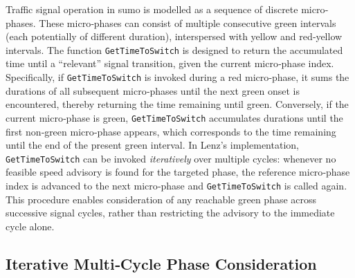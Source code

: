 Traffic signal operation in \ac{sumo} is modelled as a sequence of discrete micro‐phases. These micro‐phases can consist of multiple consecutive green intervals (each potentially of different duration), interspersed with yellow and red‐yellow intervals. The function \texttt{GetTimeToSwitch} is designed to return the accumulated time until a “relevant” signal transition, given the current micro‐phase index. Specifically, if \texttt{GetTimeToSwitch} is invoked during a red micro‐phase, it sums the durations of all subsequent micro‐phases until the next green onset is encountered, thereby returning the time remaining until green. Conversely, if the current micro‐phase is green, \texttt{GetTimeToSwitch} accumulates durations until the first non‐green micro‐phase appears, which corresponds to the time remaining until the end of the present green interval. In Lenz’s implementation, \texttt{GetTimeToSwitch} can be invoked \emph{iteratively} over multiple cycles: whenever no feasible speed advisory is found for the targeted phase, the reference micro‐phase index is advanced to the next micro‐phase and \texttt{GetTimeToSwitch} is called again. This procedure enables consideration of any reachable green phase across successive signal cycles, rather than restricting the advisory to the immediate cycle alone.

\subsection{Iterative Multi‐Cycle Phase Consideration}
\label{sec:Glosa_Iterative_Multi_Cycle}

